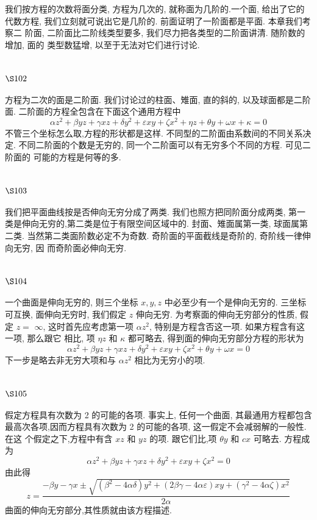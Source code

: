 我们按方程的次数将面分类, 方程为几次的, 就称面为几阶的.一个面, 给出了它的 代数方程, 我们立刻就可说出它是几阶的. 前面证明了一阶面都是平面. 本章我们考察二 阶面, 二阶面比二阶线类型要多, 我们尽力把各类型的二阶面讲清. 随阶数的增加, 面的 类型数猛增, 以至于无法对它们进行讨论.

\section{$\S 102$}

方程为二次的面是二阶面. 我们讨论过的柱面、雉面, 直的斜的, 以及球面都是二阶 面. 二阶面的方程全包含在下面这个通用方程中
\[
\alpha z^{2}+\beta y z+\gamma x z+\delta y^{2}+\varepsilon x y+\zeta x^{2}+\eta z+\theta y+\omega x+\kappa=0
\]
不管三个坐标怎么取,方程的形状都是这样. 不同型的二阶面由系数间的不同关系决定. 不同二阶面的个数是无穷的, 同一个二阶面可以有无穷多个不同的方程. 可见二阶面的 可能的方程是何等的多.

\section{$\S 103$}

我们把平面曲线按是否伸向无穷分成了两类. 我们也照方把同阶面分成两类, 第一 类是伸向无穷的,第二类是位于有限空间区域中的. 封面、雉面属第一类, 球面属第二类. 当然第二类面阶数必定不为奇数. 奇阶面的平面截线是奇阶的, 奇阶线一律伸向无穷, 因 而奇阶面必伸向无穷.

\section{$\S 104$}

一个曲面是伸向无穷的, 则三个坐标 $x, y, z$ 中必至少有一个是伸向无穷的. 三坐标 可互换, 面伸向无穷时, 我们假定 $z$ 伸向无穷. 为考察面的伸向无穷部分的性质, 假定 $z=$ $\infty$, 这时首先应考虑第一项 $\alpha z^{2}$, 特别是方程含否这一项. 如果方程含有这一项, 那么跟它 相比, 项 $\eta z$ 和 $\kappa$ 都可略去, 得到面的伸向无穷部分方程的形状为
\[
\alpha z^{2}+\beta y z+\gamma x z+\delta y^{2}+\varepsilon x y+\zeta x^{2}+\theta y+\omega x=0
\]
下一步是略去非无穷大项和与 $\alpha z^{2}$ 相比为无穷小的项. 

\section{$\S 105$}

假定方程具有次数为 2 的可能的各项. 事实上, 任何一个曲面, 其最通用方程都包含 最高次各项,因而方程具有次数为 2 的可能的各项, 这一假定不会减弱解的一般性. 在这 个假定之下,方程中有含 $x z$ 和 $y z$ 的项. 跟它们比,项 $\theta y$ 和 $c x$ 可略去. 方程成为
\[
\alpha z^{2}+\beta y z+\gamma x z+\delta y^{2}+\varepsilon x y+\zeta x^{2}=0
\]
由此得
\[
z=\frac{-\beta y-\gamma x \pm \sqrt{\left(\beta^{2}-4 \alpha \delta\right) y^{2}+(2 \beta \gamma-4 \alpha \varepsilon) x y+\left(\gamma^{2}-4 \alpha \zeta\right) x^{2}}}{2 \alpha}
\]
曲面的伸向无穷部分,其性质就由该方程描述.

